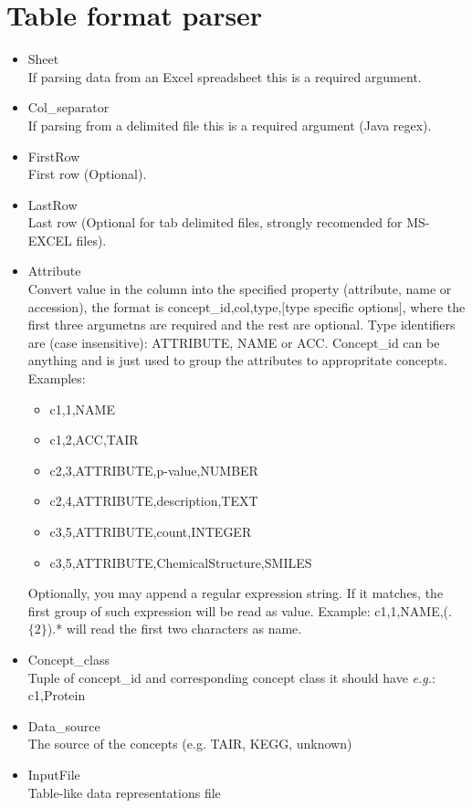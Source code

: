 \section{Table format parser}
\begin{itemize}
  \item{Sheet}\\
  If parsing data from an Excel spreadsheet this is a required argument.
  \item{Col\_separator}\\
  If parsing from a delimited file this is a required argument (Java regex).
  \item{FirstRow}\\
  First row (Optional).
  \item{LastRow}\\
  Last row (Optional for tab delimited files, strongly recomended for MS-EXCEL files).
  \item{Attribute}\\
  Convert value in the column into the specified property (attribute, name or accession), 
  the format is concept\_id,col,type,$[$type specific options$]$,
  where the first three argumetns are required and the rest are optional. 
  Type identifiers are (case insensitive): ATTRIBUTE, NAME or ACC. 
  Concept\_id can be anything and is just used to group the attributes to appropritate concepts. Examples:
  \begin{itemize}
    \item c1,1,NAME 
    \item c1,2,ACC,TAIR 
    \item c2,3,ATTRIBUTE,p-value,NUMBER 
    \item c2,4,ATTRIBUTE,description,TEXT 
    \item c3,5,ATTRIBUTE,count,INTEGER 
    \item c3,5,ATTRIBUTE,ChemicalStructure,SMILES 
  \end{itemize} 
  Optionally, you may append a regular expression string. 
  If it matches, the first group of such expression will be read as value. Example: c1,1,NAME,(.$\{2\}$).* will read the first two characters as name.
  \item{Concept\_class}\\
  Tuple of concept\_id and corresponding concept class it should have {\it{e.g.}}: c1,Protein
  \item{Data\_source}\\
  The source of the concepts (e.g. TAIR, KEGG, unknown)
  \item{InputFile}\\
  Table-like data representations file 
\end{itemize}
    
